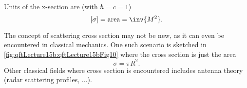 Units of the x-section are (with \( \hbar = c = 1 \))
\begin{equation}\label{eqn:qftLecture15b:480}
[\sigma] = \text{area} = \inv{M^2}.
\end{equation}

The concept of scattering cross section may not be new, as it can even be encountered in classical mechanics.  One such scenario is sketched in \cref{fig:qftLecture15b:qftLecture15bFig10} where the cross section is just the area
\begin{equation}\label{eqn:qftLecture15b:500}
\sigma = \pi R^2.
\end{equation}
Other classical fields where cross section is encountered includes antenna theory (radar scattering profiles, ...).


